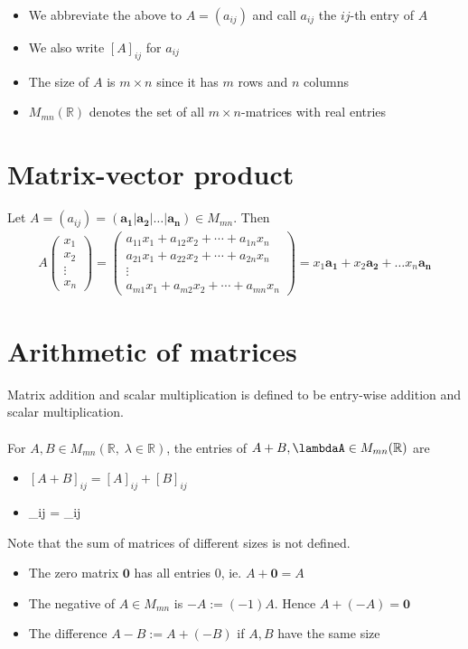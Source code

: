 \documentclass{report}
\renewcommand{\vec}{\mathbf}
\newcommand{\cvec}[1]{ \begin{pmatrix} #1 \end{pmatrix} }
\begin{document}
	\begin{itemize}
		\item We abbreviate the above to $A = (a_{ij})$ and call $a_{ij}$ the $ij$-th entry of $A$
		\item We also write $[A]_{ij}$ for $a_{ij}$
		\item The size of $A$ is $m \times n$ since it has $m$ rows and $n$ columns
		\item $M_{mn}(\mathbb{R})$ denotes the set of all $m\times n$-matrices with real entries
	\end{itemize}

	\section{Matrix-vector product}

		Let $A = (a_{ij}) = (\vec{a_1}|\vec{a_2}|\dots|\vec{a_n}) \in M_{mn}$. Then
		\begin{align*}
			A \cvec{x_1\\x_2\\\vdots\\x_n} = \cvec{a_{11}x_1 + a_{12}x_2+\cdots+a_{1n}x_n \\ a_{21}x_1 + a_{22}x_2+\cdots+a_{2n}x_n \\ \vdots \\ a_{m1}x_1 + a_{m2}x_2 + \cdots + a_{mn}x_n} = x_1 \vec{a_1} + x_2 \vec{a_2} + \dots x_n \vec{a_n}
		\end{align*}

	\section{Arithmetic of matrices}

	Matrix addition and scalar multiplication is defined to be entry-wise addition and scalar multiplication.
	\\ \\
	For $A,B \in M_{mn}(\mathbb{R}, \; \lambda \in \mathbb{R})$, the entries of $A+B, \lambdaA \in M_{mn}(\mathbb{R})$ are
	\begin{itemize}
		\item $[A+B]_{ij} = [A]_{ij} + [B]_{ij}$
		\item [\lambda A]_{ij} = \lambda [A]_{ij}
	\end{itemize}
	Note that the sum of matrices of different sizes is not defined.

	\begin{itemize}
		\item The zero matrix $\vec{0}$ has all entries 0, ie. $A + \vec{0} = A$
		\item The negative of $A \in M_{mn}$ is $-A := (-1)A$. Hence $A + (-A) = \vec{0}$
		\item The difference $A-B := A + (-B)$ if $A,B$ have the same size
	\end{itemize}
\end{document}
